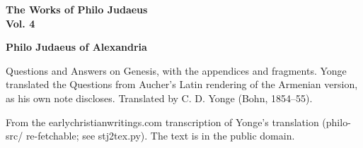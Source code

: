 \documentclass[11pt,letterpaper]{article}
\begin{document}
\color{ink}

\begin{titlepage}
\centering
\vspace*{4em}
{\LARGE\bfseries\color{heading} The Works of Philo Judaeus\\[0.3em]Vol. 4\par}
\vspace{2em}
{\Large\bfseries\color{heading} Philo Judaeus of Alexandria\par}
\vspace{2.5em}
{\itshape\color{subhead}\parbox{0.8\linewidth}{\centering Questions and Answers on Genesis, with the appendices and fragments. Yonge translated the Questions from Aucher's Latin rendering of the Armenian version, as his own note discloses. Translated by C. D. Yonge (Bohn, 1854--55).\par}}
\vfill
{\small From the earlychristianwritings.com transcription of Yonge's translation (philo-src/ re-fetchable; see stj2tex.py). The text is in the public domain.\par}
\vspace{2em}
\end{titlepage}

\tableofcontents


\end{document}
